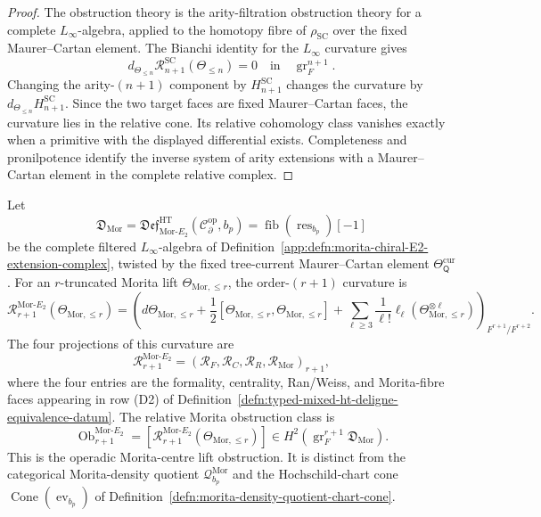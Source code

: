 \begin{proof}
The obstruction theory is the arity-filtration obstruction theory for a
complete \(L_\infty\)-algebra, applied to the homotopy fibre of
\(\rho_{\mathrm{SC}}\) over the fixed Maurer--Cartan element.  The
Bianchi identity for the \(L_\infty\) curvature gives
\[
  d_{\Theta_{\le n}}
  \mathcal R^{\mathrm{SC}}_{n+1}(\Theta_{\le n})=0
  \quad\text{in}\quad
  \operatorname{gr}^{n+1}_{F}.
\]
Changing the arity-\((n+1)\) component by
\(H^{\mathrm{SC}}_{n+1}\) changes the curvature by
\(d_{\Theta_{\le n}}H^{\mathrm{SC}}_{n+1}\).  Since the two target faces
are fixed Maurer--Cartan faces, the curvature lies in the relative cone.
Its relative cohomology class vanishes exactly when a primitive with the
displayed differential exists.  Completeness and pronilpotence identify
the inverse system of arity extensions with a Maurer--Cartan element in
the complete relative complex.
\end{proof}

\begin{defn}
\label{defn:relative-morita-e2-extension-obstruction}
Let
\[
  \mathfrak D_{\mathrm{Mor}}
  =
  \mathfrak{Def}^{\mathrm{HT}}_{\mathrm{Mor}\mbox{-}E_2}
  (\mathcal C^{\mathrm{op}}_\partial,b_p)
  =
  \operatorname{fib}(\operatorname{res}_{b_p})[-1]
\]
be the complete filtered \(L_\infty\)-algebra of
Definition~\ref{app:defn:morita-chiral-E2-extension-complex}, twisted
by the fixed tree-current Maurer--Cartan element
\(\Theta_{\mathsf Q}^{\mathrm{cur}}\).  For an \(r\)-truncated Morita
lift \(\Theta_{\mathrm{Mor},\le r}\), the order-\((r+1)\) curvature is
\[
  \mathcal R^{\mathrm{Mor}\mbox{-}E_2}_{r+1}
  (\Theta_{\mathrm{Mor},\le r})
  =
  \left(
  d\Theta_{\mathrm{Mor},\le r}
  +\frac12[\Theta_{\mathrm{Mor},\le r},
           \Theta_{\mathrm{Mor},\le r}]
  +\sum_{\ell\ge3}\frac1{\ell!}
    \ell_\ell(\Theta_{\mathrm{Mor},\le r}^{\otimes\ell})
  \right)_{F^{r+1}/F^{r+2}} .
\]
The four projections of this curvature are
\[
  \mathcal R^{\mathrm{Mor}\mbox{-}E_2}_{r+1}
  =
  (\mathcal R_F,\mathcal R_C,\mathcal R_R,\mathcal R_{\mathrm{Mor}})_{r+1},
\]
where the four entries are the formality, centrality, Ran/Weiss, and
Morita-fibre faces appearing in row \textup{(D2)} of
Definition~\ref{defn:typed-mixed-ht-deligne-equivalence-datum}.  The
relative Morita obstruction class is
\[
  \operatorname{Ob}^{\mathrm{Mor}\mbox{-}E_2}_{r+1}
  =
  \left[
  \mathcal R^{\mathrm{Mor}\mbox{-}E_2}_{r+1}
  (\Theta_{\mathrm{Mor},\le r})
  \right]
  \in
  H^2\!\left(
    \operatorname{gr}^{r+1}_{F}\mathfrak D_{\mathrm{Mor}}
  \right).
\]
This is the operadic Morita-centre lift obstruction.  It is distinct
from the categorical Morita-density quotient
\(\mathcal Q^{\mathrm{Mor}}_{b_p}\) and the Hochschild-chart cone
\(\operatorname{Cone}(\operatorname{ev}_{b_p})\) of
Definition~\ref{defn:morita-density-quotient-chart-cone}.
\end{defn}

